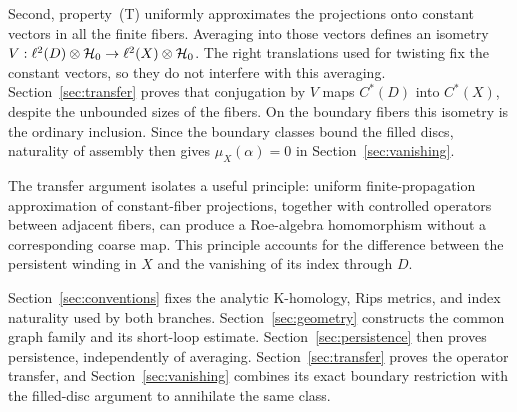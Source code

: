 Second, property~(T) uniformly approximates the projections onto constant
vectors in all the finite fibers. Averaging into those vectors defines an
isometry $V:\ell^2(D)\otimes\mathcal H_0\to\ell^2(X)\otimes\mathcal H_0$.
The right translations used for twisting fix the constant vectors, so they
do not interfere with this averaging.
Section~\ref{sec:transfer} proves that conjugation by $V$ maps $C^*(D)$ into
$C^*(X)$, despite the unbounded sizes of the fibers. On the boundary fibers
this isometry is the ordinary inclusion. Since the boundary classes bound
the filled discs, naturality of assembly then gives $\mu_X(\alpha)=0$ in
Section~\ref{sec:vanishing}.

The transfer argument isolates a useful principle: uniform finite-propagation
approximation of constant-fiber projections, together with controlled
operators between adjacent fibers, can produce a Roe-algebra homomorphism
without a corresponding coarse map. This principle accounts for the
difference between the persistent winding in $X$ and the vanishing of its
index through $D$.


Section~\ref{sec:conventions} fixes the analytic K-homology, Rips metrics,
and index naturality used by both branches. Section~\ref{sec:geometry}
constructs the common graph family and its short-loop estimate.
Section~\ref{sec:persistence} then proves persistence, independently of
averaging. Section~\ref{sec:transfer} proves the operator transfer, and
Section~\ref{sec:vanishing} combines its exact boundary restriction with
the filled-disc argument to annihilate the same class.
